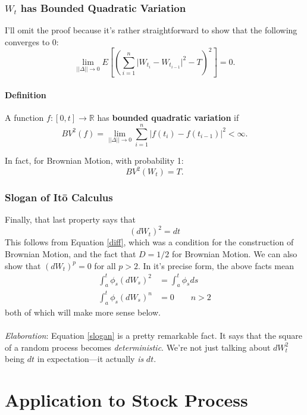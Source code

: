 \documentclass[a4paper,12pt]{scrartcl}
\begin{document}
\subsubsection{$W_t$ has Bounded Quadratic Variation} 

      I'll omit the proof because it's rather 
      straightforward to show that the following converges to 0:
      \[ \lim_{||\Delta || \rightarrow 0} E\left[ \left(\sum_{i=1}^n 
	 \lvert W_{t_i} - W_{t_{i-1}} \rvert^2 -T\right)^2 \right]=0.\] 

      \paragraph{Definition} A function $f: [0,t] \rightarrow \mathbb{R}$
      has \textbf{bounded quadratic variation} if 
	 \[ BV^2(f) = \lim_{||\Delta|| \rightarrow 0} \sum^n_{i=1} 
	    \left\lvert f(t_i) - f(t_{i-1}) \right\rvert^2 < \infty.\]
      
      In fact, for Brownian Motion, with probability 1:
	 \[BV^2(W_t) = T.\]

\subsubsection{Slogan of It\={o} Calculus}
      
Finally, that last property says that
\begin{equation}
    \label{slogan}
     (dW_t)^2 = dt 
\end{equation}
This follows from Equation \ref{diff}, which was a condition for
the construction of Brownian Motion, and the fact that $D=1/2$
for Brownian Motion. We can also show that $(dW_t)^p = 0$ for all $p>2$.
In it's precise form, the above facts mean
\begin{align*}
    \int^t_a \phi_s (dW_s)^2 &=  \int^t_a \phi_s ds \\
    \int^t_a \phi_s (dW_s)^n &= 0 \qquad n>2
\end{align*}
both of which will make more sense below.
\\
\\
{\sl Elaboration}: Equation \ref{slogan} is a pretty remarkable fact.
It says that the square of a random process becomes \emph{deterministic}.
We're not just talking about $dW^2_t$ being $dt$ in expectation---it 
actually \emph{is} $dt$.

\section{Application to Stock Process}
\end{document}

